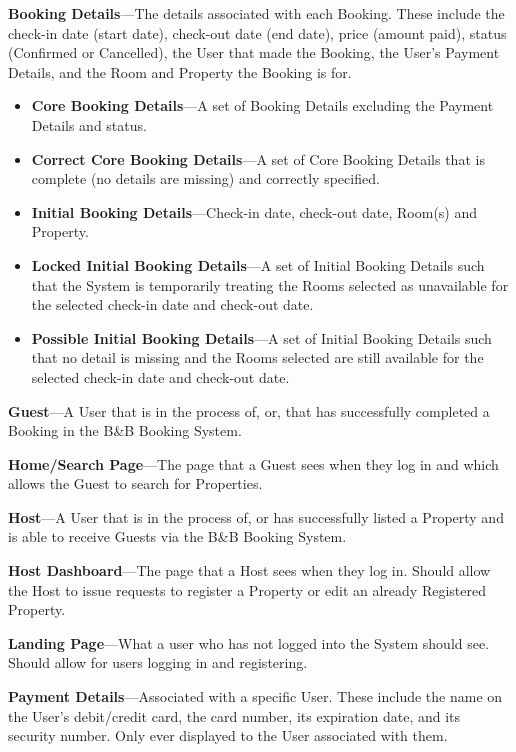 \textbf{Booking Details}---The details associated with each Booking. These include the check-in date (start date), check-out date (end date), price (amount paid), status (Confirmed or Cancelled), the User that made the Booking, the User's Payment Details, and the Room and Property the Booking is for.
\begin{itemize}
    \item \textbf{Core Booking Details}---A set of Booking Details excluding the Payment Details and status.
    \item \textbf{Correct Core Booking Details}---A set of Core Booking Details that is complete (no details are missing) and correctly specified. 
    \item \textbf{Initial Booking Details}---Check-in date, check-out date, Room(s) and Property.
    \item \textbf{Locked Initial Booking Details}---A set of Initial Booking Details such that the System is temporarily treating the Rooms selected as unavailable for the selected check-in date and check-out date.
    \item \textbf{Possible Initial Booking Details}---A set of Initial Booking Details such that no detail is missing and the Rooms selected are still available for the selected check-in date and check-out date.
\end{itemize} 

\textbf{Guest}---A User that is in the process of, or, that has successfully completed a Booking in the B\&B Booking System.

\textbf{Home/Search Page}---The page that a Guest sees when they log in and which allows the Guest to search for Properties.

\textbf{Host}---A User that is in the process of, or has successfully listed a Property and is able to receive Guests via the B\&B Booking System.

\textbf{Host Dashboard}---The page that a Host sees when they log in. Should allow the Host to issue requests to register a Property or edit an already Registered Property.

\textbf{Landing Page}---What a user who has not logged into the System should see. Should allow for users logging in and registering.

\textbf{Payment Details}---Associated with a specific User. These include the name on the User's debit/credit card, the card number, its expiration date, and its security number. Only ever displayed to the User associated with them.

